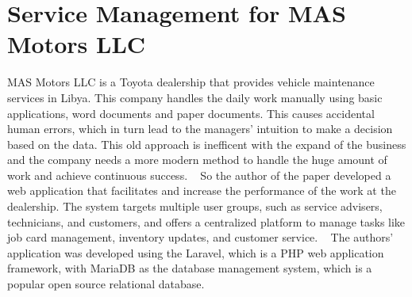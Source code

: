 




\section{Service Management for MAS Motors LLC}

MAS Motors LLC is a Toyota dealership that provides vehicle maintenance services in Libya.
This company handles the daily work manually using basic applications, word documents and paper documents.
This causes accidental human errors, which in turn lead to the managers' intuition to make a decision based on the data.
This old approach is inefficent with the expand of the business and the company needs a more modern method to handle the huge amount of work and achieve continuous success. ~\cite{MARS_MOTORS}
So the author of the paper developed a web application that facilitates and increase the performance of the work at the dealership.
The system targets multiple user groups, such as service advisers, technicians, and customers, and offers a centralized platform to manage tasks like job card management, inventory updates, and customer service. ~\cite{MARS_MOTORS}
The authors' application was developed using the Laravel, which is a PHP web application framework, with MariaDB as the database management system, which is a popular open source relational database.


